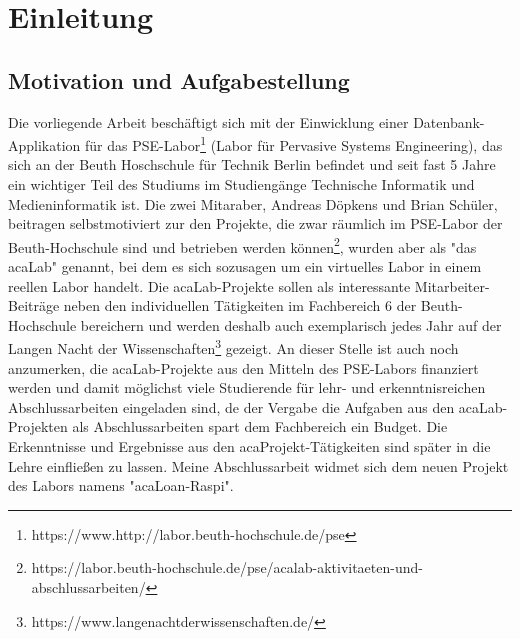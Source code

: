 \chapter{Einleitung}
\label{sec:intro}
\section{Motivation und Aufgabestellung}
\label{sec:intro:motivation}
Die vorliegende Arbeit beschäftigt sich mit der Einwicklung einer Datenbank-Applikation für das PSE-Labor\footnote{https://www.http://labor.beuth-hochschule.de/pse} (Labor für Pervasive Systems Engineering), das sich an der Beuth Hoschschule für Technik Berlin befindet und seit fast 5 Jahre ein wichtiger Teil des Studiums im Studiengänge Technische Informatik und Medieninformatik ist. Die zwei Mitaraber, Andreas Döpkens und Brian Schüler, beitragen selbstmotiviert zur den  Projekte, die zwar räumlich im PSE-Labor der Beuth-Hochschule sind und betrieben werden können\footnote{https://labor.beuth-hochschule.de/pse/acalab-aktivitaeten-und-abschlussarbeiten/}, wurden aber als "das acaLab" genannt, bei dem es sich sozusagen um ein virtuelles Labor in einem reellen Labor handelt. Die acaLab-Projekte sollen als interessante Mitarbeiter-Beiträge neben den individuellen Tätigkeiten im Fachbereich 6 der Beuth-Hochschule bereichern und werden deshalb auch exemplarisch jedes Jahr auf der Langen Nacht der Wissenschaften\footnote{https://www.langenachtderwissenschaften.de/} gezeigt. An dieser Stelle ist auch noch anzumerken, die acaLab-Projekte aus den Mitteln des PSE-Labors finanziert werden und damit möglichst viele Studierende für lehr- und erkenntnisreichen Abschlussarbeiten eingeladen sind, de der Vergabe die Aufgaben aus den acaLab-Projekten als Abschlussarbeiten spart dem Fachbereich ein Budget. Die Erkenntnisse und Ergebnisse aus den acaProjekt-Tätigkeiten sind später in die Lehre einfließen zu lassen. Meine Abschlussarbeit widmet sich dem neuen Projekt des Labors namens "acaLoan-Raspi".

